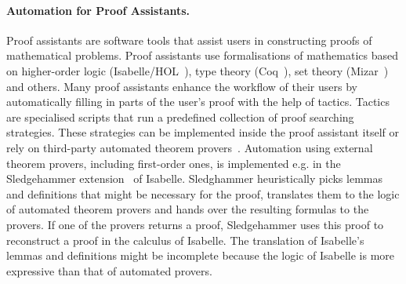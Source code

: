 \paragraph{Automation for Proof Assistants.}
Proof assistants are software tools that assist users in constructing proofs of mathematical problems. Proof assistants use formalisations of mathematics based on higher-order logic (Isabelle/HOL~\cite{Isabelle}), type theory (Coq~\cite{Coq}), set theory (Mizar~\cite{Mizar}) and others. Many proof assistants enhance the workflow of their users by automatically filling in parts of the user's proof with the help of tactics. Tactics are specialised scripts that run a predefined collection of proof searching strategies. These strategies can be implemented inside the proof assistant itself or rely on third-party automated theorem provers~\cite{Sledgehammer,DBLP:conf/icms/UrbanHV10}. Automation using external theorem provers, including first-order ones, is implemented e.g. in the Sledgehammer extension~\cite{Sledgehammer} of Isabelle. Sledghammer heuristically picks lemmas and definitions that might be necessary for the proof, translates them to the logic of automated theorem provers and hands over the resulting formulas to the provers. If one of the provers returns a proof, Sledgehammer uses this proof to reconstruct a proof in the calculus of Isabelle. The translation of Isabelle's lemmas and definitions might be incomplete because the logic of Isabelle is more expressive than that of automated provers.

